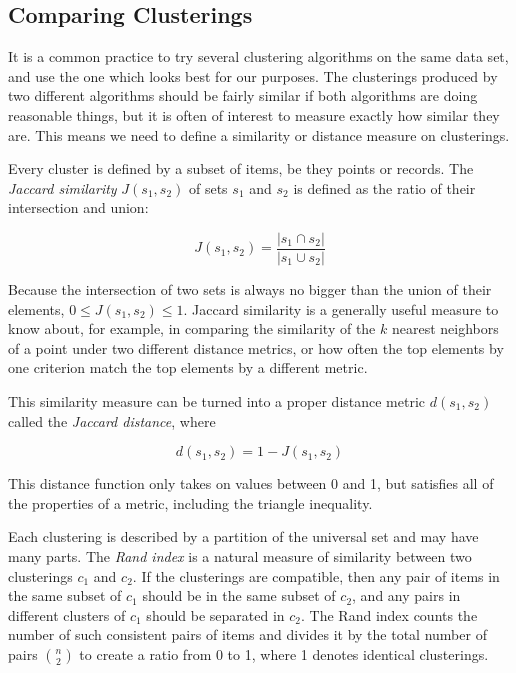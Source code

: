 \documentclass[10pt]{article}
\begin{document}
\subsection{Comparing Clusterings}

It is a common practice to try several clustering algorithms on the same data set, and use the one which looks best for our purposes. The clusterings produced by two different algorithms should be fairly similar if both algorithms are doing reasonable things, but it is often of interest to measure exactly how similar they are. This means we need to define a similarity or distance measure on clusterings.

Every cluster is defined by a subset of items, be they points or records. The \emph{Jaccard similarity} $J(s_{1}, s_{2})$ of sets $s_{1}$ and $s_{2}$ is defined as the ratio of their intersection and union:

\[
J(s_{1}, s_{2})=\frac{|s_{1} \cap s_{2}|}{|s_{1} \cup s_{2}|}
\]

Because the intersection of two sets is always no bigger than the union of their elements, $0 \leq J(s_{1}, s_{2}) \leq 1$. Jaccard similarity is a generally useful measure to know about, for example, in comparing the similarity of the $k$ nearest neighbors of a point under two different distance metrics, or how often the top elements by one criterion match the top elements by a different metric.

This similarity measure can be turned into a proper distance metric $d(s_{1}, s_{2})$ called the \emph{Jaccard distance}, where

\[
d(s_{1}, s_{2})=1-J(s_{1}, s_{2})
\]

This distance function only takes on values between 0 and 1, but satisfies all of the properties of a metric, including the triangle inequality.

Each clustering is described by a partition of the universal set and may have many parts. The \emph{Rand index} is a natural measure of similarity between two clusterings $c_{1}$ and $c_{2}$. If the clusterings are compatible, then any pair of items in the same subset of $c_{1}$ should be in the same subset of $c_{2}$, and any pairs in different clusters of $c_{1}$ should be separated in $c_{2}$. The Rand index counts the number of such consistent pairs of items and divides it by the total number of pairs $\binom{n}{2}$ to create a ratio from 0 to 1, where 1 denotes identical clusterings.
\end{document}
